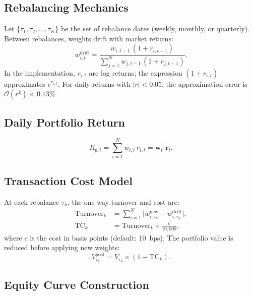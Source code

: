 \documentclass[12pt,a4paper]{article}
\begin{document}
\subsection{Rebalancing Mechanics}

Let $\{\tau_1, \tau_2, \ldots, \tau_K\}$ be the set of rebalance dates (weekly, monthly, or quarterly). Between rebalances, weights drift with market returns:
\begin{equation}
    w_{i,t}^{\text{drift}} = \frac{w_{i,t-1}\,(1 + r_{i,t-1})}
        {\sum_{j=1}^N w_{j,t-1}\,(1 + r_{j,t-1})}.
    \label{eq:drift}
\end{equation}
In the implementation, $r_{i,t}$ are log returns; the expression $(1 + r_{i,t})$ approximates $e^{r_{i,t}}$. For daily returns with $|r| < 0.05$, the approximation error is $\mathcal{O}(r^2) < 0.13\%$.

\subsection{Daily Portfolio Return}

\begin{equation}
    R_{p,t} = \sum_{i=1}^{N} w_{i,t}\, r_{i,t} = \bm{w}_t^\top \bm{r}_t.
    \label{eq:portfolio-return}
\end{equation}

\subsection{Transaction Cost Model}

At each rebalance $\tau_k$, the one-way turnover and cost are:
\begin{align}
    \text{Turnover}_k &= \sum_{i=1}^{N} \bigl|w_{i,\tau_k}^{\text{new}} - w_{i,\tau_k}^{\text{drift}}\bigr|,
    \label{eq:turnover} \\
    \text{TC}_k &= \text{Turnover}_k \times \frac{c}{10{,}000},
    \label{eq:tc}
\end{align}
where $c$ is the cost in basis points (default: 10~bps). The portfolio value is reduced before applying new weights:
\begin{equation}
    V_{\tau_k}^{\text{post}} = V_{\tau_k} \times (1 - \text{TC}_k).
    \label{eq:tc-apply}
\end{equation}

\subsection{Equity Curve Construction}
\end{document}
